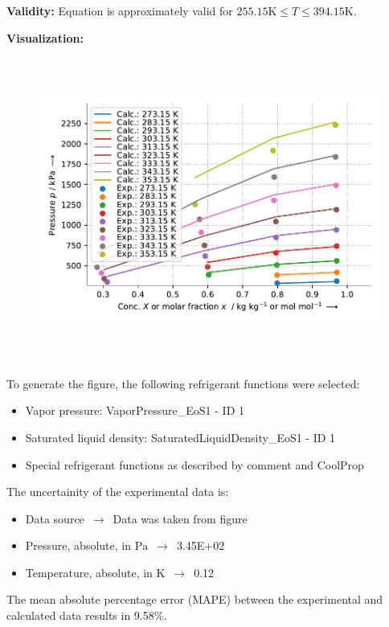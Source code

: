 \textbf{Validity:}
\newline
Equation is approximately valid for $255.15 \si{\kelvin} \leq T \leq 394.15 \si{\kelvin}$.
\newline

\textbf{Visualization:}
%
\begin{figure}[!htp]
{\noindent\includegraphics[height=10cm, keepaspectratio]{figs/abs/abs_R-12_paraffinic__WilsonFixedDl_1.pdf}}
\end{figure}
%

To generate the figure, the following refrigerant functions were selected:
\begin{itemize}
\item Vapor pressure: VaporPressure\_EoS1 - ID 1
\item Saturated liquid density: SaturatedLiquidDensity\_EoS1 - ID 1
\item Special refrigerant functions as described by comment and CoolProp
\end{itemize}

The uncertainity of the experimental data is:
\begin{itemize}
\item Data source $\,\to\,$ Data was taken from figure
\item Pressure, absolute, in $\si{\pascal}$ $\,\to\,$ 3.45E+02
\item Temperature, absolute, in $\si{\kelvin}$ $\,\to\,$ 0.12
\end{itemize}

The mean absolute percentage error (MAPE) between the experimental and calculated data results in 9.58\%.
\FloatBarrier
\newpage
